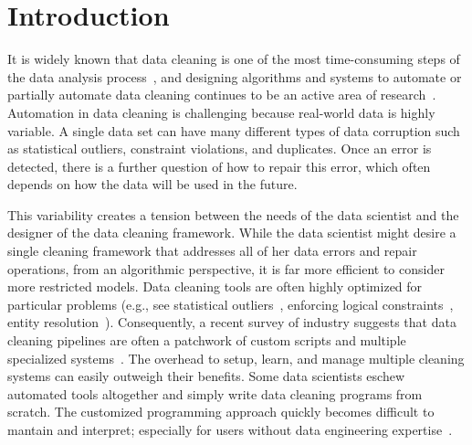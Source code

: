 \section{Introduction}\label{intro}\sloppy
It is widely known that data cleaning is one of the most time-consuming steps of the data analysis process~\cite{nytimes}, and
designing algorithms and systems to automate or partially automate data cleaning continues to be an active area of research~\cite{DBLP:conf/sigmod/ChuIKW16}.
Automation in data cleaning is challenging because real-world data is highly variable. 
A single data set can have many different types of data corruption such as statistical outliers, constraint violations, and duplicates.
Once an error is detected, there is a further question of how to repair this error, which often depends on how the data will be used in the future.

This variability creates a tension between the needs of the data scientist and the designer of the data cleaning framework.
While the data scientist might desire a single cleaning framework that addresses all of her data errors and repair operations, from an algorithmic perspective, it is far more efficient to consider more restricted models.
Data cleaning tools are often highly optimized for particular problems  (e.g., see statistical outliers~\cite{hellerstein2008quantitative}, enforcing logical constraints~\cite{DBLP:conf/sigmod/ChuIKW16}, entity resolution~\cite{DBLP:journals/pvldb/KopckeTR10}). 
Consequently, a recent survey of industry suggests that data cleaning pipelines are often a patchwork of custom scripts and multiple specialized systems~\cite{krishnan2016hilda}.
The overhead to setup, learn, and manage multiple cleaning systems can easily outweigh their benefits.
Some data scientists eschew automated tools altogether and simply write data cleaning programs from scratch.
The customized programming approach quickly becomes difficult to mantain and interpret; especially for users without data engineering expertise~\cite{sculley2014machine}.

